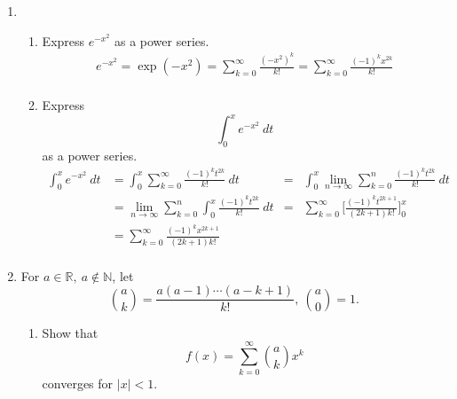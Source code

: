 \documentclass{article}
\begin{document}
\thispagestyle{fancy}
\begin{enumerate}[label=(\arabic*)]
    \item 
        \begin{enumerate}
            \item Express $e^{-x^2}$ as a power series.
                \begin{align*}
                    e^{-x^2} = \exp{(-x^2)} = \sum_{k=0}^{\infty} \frac{(-x^2)^k}{k!} = \sum_{k=0}^{\infty} \frac{(-1)^kx^{2k}}{k!} \\
                \end{align*}
            \item Express \[ \int_0^x e^{-x^2}\ dt \] as a power series.
                \begin{align*}
                    \int_0^x e^{-x^2}\ dt &= \int_0^x \sum_{k=0}^{\infty} \frac{(-1)^kt^{2k}}{k!} \ dt &=& \int_0^x \lim_{n\rightarrow \infty} \sum_{k=0}^{n} \frac{(-1)^kt^{2k}}{k!} \ dt \\
                    &= \lim_{n\rightarrow \infty} \sum_{k=0}^{n} \int_0^x \frac{(-1)^kt^{2k}}{k!} \ dt &=& \sum_{k=0}^{\infty} \Bigg[ \frac{(-1)^kt^{2k + 1}}{(2k + 1)k!} \Bigg]_0^x \\
                    &= \sum_{k=0}^{\infty} \frac{(-1)^kx^{2k + 1}}{(2k + 1)k!} \\
                \end{align*}
        \end{enumerate}
    \newpage
    \item For $a \in \mathbb{R},\ a \not \in \mathbb{N}$, let
        \[ \binom{a}{k} = \frac{a(a-1)\cdots(a-k+1)}{k!},\ \binom{a}{0} = 1.\]
        \begin{enumerate}
            \item Show that
                \[ f(x) = \sum_{k=0}^{\infty} \binom{a}{k} x^k \]
                converges for $|x| < 1$.
                

\end{enumerate}
\end{enumerate}
\end{document}
